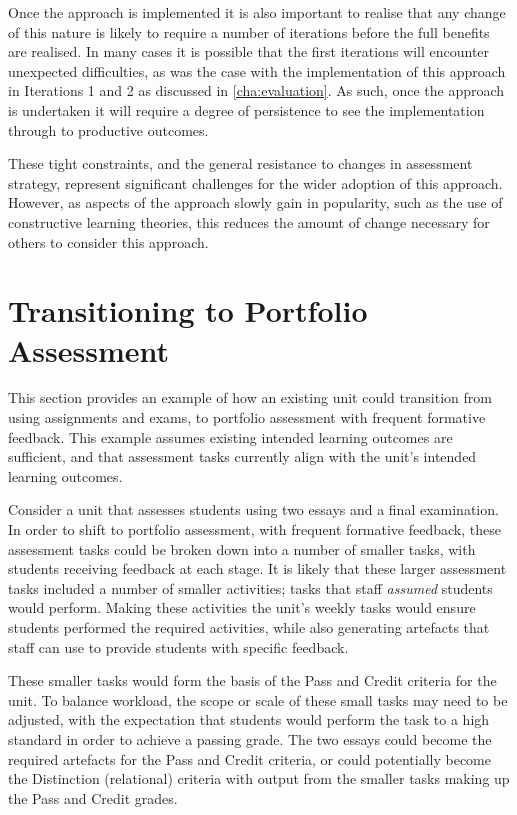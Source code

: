 Once the approach is implemented it is also important to realise that any change of this nature is likely to require a number of iterations before the full benefits are realised. In many cases it is possible that the first iterations will encounter unexpected difficulties, as was the case with the implementation of this approach in Iterations 1 and 2 as discussed in \cref{cha:evaluation}. As such, once the approach is undertaken it will require a degree of persistence to see the implementation through to productive outcomes. 

These tight constraints, and the general resistance to changes in assessment strategy, represent significant challenges for the wider adoption of this approach. However, as aspects of the approach slowly gain in popularity, such as the use of constructive learning theories, this reduces the amount of change necessary for others to consider this approach.







\section{Transitioning to Portfolio Assessment} %
\label{sec:transitioning_to_portfolio_assessment}

This section provides an example of how an existing unit could transition from using assignments and exams, to portfolio assessment with frequent formative feedback. This example assumes existing intended learning outcomes are sufficient, and that assessment tasks currently align with the unit's intended learning outcomes.

Consider a unit that assesses students using two essays and a final examination. In order to shift to portfolio assessment, with frequent formative feedback, these assessment tasks could be broken down into a number of smaller tasks, with students receiving feedback at each stage. It is likely that these larger assessment tasks included a number of smaller activities; tasks that staff \emph{assumed} students would perform. Making these activities the unit's weekly tasks would ensure students performed the required activities, while also generating artefacts that staff can use to provide students with specific feedback.

These smaller tasks would form the basis of the Pass and Credit criteria for the unit. To balance workload, the scope or scale of these small tasks may need to be adjusted, with the expectation that students would perform the task to a high standard in order to achieve a passing grade. The two essays could become the required artefacts for the Pass and Credit criteria, or could potentially become the Distinction (relational) criteria with output from the smaller tasks making up the Pass and Credit grades.

